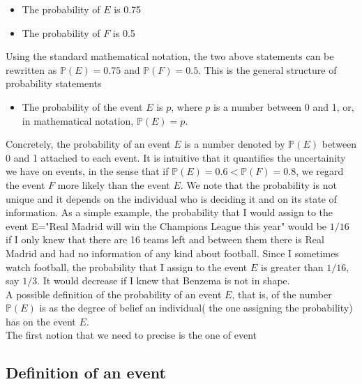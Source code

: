 \documentclass[12pt]{article}
\newcommand{\<}{{\langle \!\! \langle}}
\renewcommand{\>}{{\rangle \!\! \rangle}}
\begin{document}
\begin{itemize}

	\item The probability of $E$ is 0.75\\
	\item The probability of $F$ is 0.5\\

\end{itemize}

Using the standard mathematical notation, the two above statements can be rewritten as $\mathbb{P}(E)=0.75$ and $ \mathbb{P}(F)=0.5$. This is the general structure of probability statements

\begin{itemize}
	\item The probability of the event $E$  is $p$, where $p$ is a number between 0 and 1, or, in mathematical notation, $\mathbb{P}(E)=p$.\\    
\end{itemize} 

Concretely, the probability of an event $E$ is a number denoted by $\mathbb{P}(E)$ between 0 and 1 attached to each event. It is intuitive that it quantifies the uncertainity we have on events, in the sense that if $\mathbb{P}(E)=0.6< \mathbb{P}(F)=0.8$, we regard the event $F$ more likely than the event $E$. We note that the probability is not unique and it depends on the individual who is deciding it  and on its state of information. As a simple example, the probability that I would assign to the event E="Real Madrid will win the Champions League this year" would be $1/16$ if I only knew that there are 16 teams left and between them there is Real Madrid and had no information of any kind about football. Since I sometimes watch football, the probability that I assign to the event $E$ is greater than $1/16$, say $1/3$. It would decrease if I knew that Benzema is not in shape.\\
A possible definition of the probability of an event $E$, that is, of the number $\mathbb{P}(E)$ is as the degree  of belief an individual( the one assigning the probability) has on the event $E$. \\
The first notion that we need to precise is the one of event


\subsection{Definition of an event}
\end{document}
